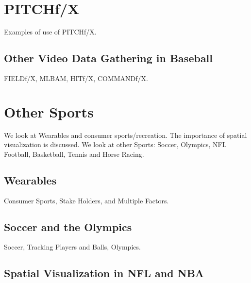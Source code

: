 \section{PITCHf/X}\label{pitchfx}

Examples of use of PITCHf/X.




\subsection{Other Video Data Gathering in Baseball}

FIELDf/X, MLBAM, HITf/X, COMMANDf/X.





\section{Other Sports}

We look at Wearables and consumer sports/recreation. The importance of
spatial visualization is discussed. We look at other Sports: Soccer,
Olympics, NFL Football, Basketball, Tennis and Horse Racing.




\subsection{Wearables}\label{wearables}

Consumer Sports, Stake Holders, and Multiple Factors.




\subsection{Soccer and the Olympics}\label{soccer-and-the-olympics}

Soccer, Tracking Players and Balls, Olympics.





\subsection{Spatial Visualization in NFL and NBA}

